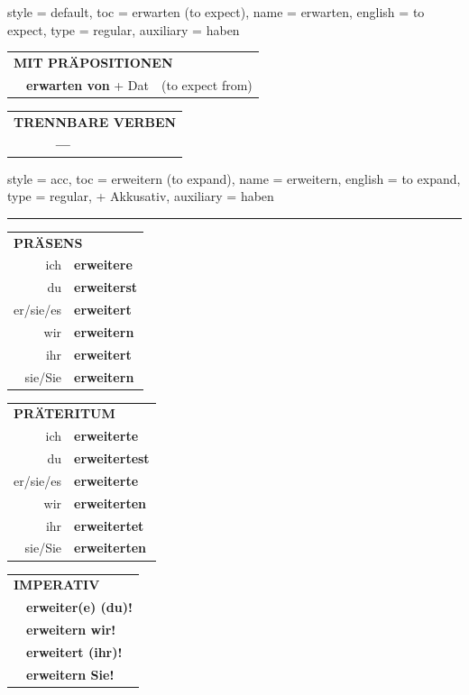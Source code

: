 \begin{verbentry}{
  style = {default},
  toc = {erwarten (to expect)},
  name = {erwarten},
  english = {to expect},
  type = {regular},
  auxiliary = {haben}
}
\vspace{10pt}

\begin{tabular}{lll}
\multicolumn{3}{l}{\textbf{MIT PRÄPOSITIONEN}}\\
& \textbf{erwarten von} + Dat & (to expect from)\\
\end{tabular}
\hfill
\begin{tabular}{lll}
\multicolumn{3}{l}{\textbf{TRENNBARE VERBEN}}\\
& \textbf{---} & \\
\end{tabular}
\vspace{-5pt}
\end{verbentry}

\begin{verbentry}{
  style = {acc},
  toc = {erweitern (to expand)},
  name = {erweitern},
  english = {to expand},
  type = {regular, + Akkusativ},
  auxiliary = {haben}
}


\vspace{5pt}
\hrule
\vspace{5pt}

\begin{tabular}{rl}
\multicolumn{2}{l}{\textbf{PRÄSENS}}\\
ich & \textbf{erweitere}\\
du & \textbf{erweiterst}\\
er/sie/es & \textbf{erweitert}\\
wir & \textbf{erweitern}\\
ihr & \textbf{erweitert}\\
sie/Sie & \textbf{erweitern}\\
\end{tabular}
\hfill
\begin{tabular}{rl}
\multicolumn{2}{l}{\textbf{PRÄTERITUM}}\\
ich & \textbf{erweiterte}\\
du & \textbf{erweitertest}\\
er/sie/es & \textbf{erweiterte}\\
wir & \textbf{erweiterten}\\
ihr & \textbf{erweitertet}\\
sie/Sie & \textbf{erweiterten}\\
\end{tabular}
\hfill
\begin{tabular}{rl}
\multicolumn{2}{l}{\textbf{IMPERATIV}}\\
& \textbf{erweiter(e) (du)!}\\
& \textbf{erweitern wir!}\\
& \textbf{erweitert (ihr)!}\\
& \textbf{erweitern Sie!}\\
\end{tabular}


\end{verbentry}
